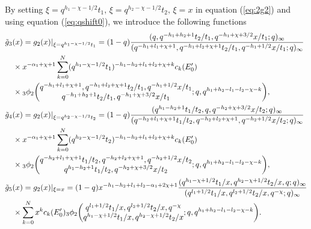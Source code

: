 \documentclass[12pt]{amsart}
\numberwithin{equation}{section}
\theoremstyle{definition}
\theoremstyle{remark}
\begin{document}
By setting $\xi = q^{h_{1} - \chi - 1/2}t_{1}, \, \xi = q^{h_{2} - \chi - 1/2}t_{2}, \, \xi = x$ in equation (\ref{eq:2g2}) and using equation (\ref{eq:qshift0}), we introduce the following functions
  \begin{align*}
& \tilde{g}_{3}(x) = g_2 (x) | _{\xi = q^{h_{1} - \chi - 1/2}t_{1} } = (1 - q) \frac{(q, q^{- h_{1} + h_{2} + 1}t_{2}/t_{1}, q^{- h_{1} + \chi + 3/2}x/t_{1}; q)_\infty}{(q^{-h_{1} + l_{1} + \chi + 1}, q^{-h_{1} + l_{2} + \chi + 1}t_{2}/t_{1}, q^{-h_{1} + 1/2}x/t_{1}; q)_\infty} \notag \\
  &\quad \times x^{-\alpha_{1} + \chi + 1} \sum_{k = 0}^{N} (q^{h_{1} - \chi - 1/2}t_{1})^{-h_{1} - h_{2} + l_{1} + l_{2} + \chi + k} c_{k} (E_{0}') \notag \\
  &\quad \times {}_3\phi_2 \biggl( \begin{array}{@{}c@{}} q^{-h_{1} + l_{1} + \chi + 1}, q^{-h_{1} + l_{2} + \chi + 1}t_{2}/t_{1}, q^{-h_{1} + 1/2}x/t_{1} \\
     q^{- h_{1} + h_{2} + 1}t_{2}/t_{1}, q^{- h_{1} + \chi + 3/2}x/t_{1} \end{array} ;q,q^{h_{1} + h_{2} - l_{1} - l_{2} - \chi - k} \biggr), \\
& \tilde{g}_{4}(x) = g_2 (x) | _{\xi = q^{h_{2} - \chi - 1/2}t_{2} } =  (1 - q)  \frac{(q^{h_{1} - h_{2} + 1}t_{1}/t_{2}, q, q^{- h_{2} + \chi + 3/2}x/t_{2}; q)_\infty}{(q^{-h_{2} + l_{1} + \chi + 1}t_{1}/t_{2}, q^{-h_{2} + l_{2} + \chi + 1}, q^{-h_{2} + 1/2}x/t_{2}; q)_\infty} \notag \\
  &\quad \times x^{-\alpha_{1} + \chi + 1} \sum_{k = 0}^{N} (q^{h_{2} - \chi - 1/2}t_{2})^{-h_{1} - h_{2} + l_{1} + l_{2} + \chi + k} c_{k} (E_{0}') \notag \\
  &\quad \times {}_3\phi_2 \biggl( \begin{array}{@{}c@{}} q^{-h_{2} + l_{1} + \chi + 1}t_{1}/t_{2}, q^{-h_{2} + l_{2} + \chi + 1}, q^{-h_{2} + 1/2}x/t_{2} \\
     q^{h_{1} - h_{2} + 1}t_{1}/t_{2}, q^{- h_{2} + \chi + 3/2}x/t_{2} \end{array} ;q,q^{h_{1} + h_{2} - l_{1} - l_{2} - \chi - k} \biggr), \\
& \tilde{g}_{5}(x) = g_2 (x) | _{\xi =  x } =  (1 - q) x^{-h_{1} - h_{2} + l_{1} + l_{2} -\alpha_{1} + 2\chi + 1} \frac{(q^{h_{1} - \chi + 1/2}t_{1}/x, q^{h_{2} - \chi + 1/2}t_{2}/x, q; q)_{\infty}}{(q^{l_{1} + 1/2}t_{1}/x, q^{l_{2} + 1/2}t_{2}/x, q^{-\chi}; q)_{\infty}} \notag \\
  &\quad \times \sum_{k = 0}^{N} x^k c_{k}  (E_{0}') {}_3\phi_2 \biggl( \begin{array}{@{}c@{}} q^{l_{1} + 1/2}t_{1}/x, q^{l_{2} + 1/2}t_{2}/x, q^{-\chi} \\
     q^{h_{1} - \chi + 1/2}t_{1}/x, q^{h_{2} - \chi + 1/2}t_{2}/x \end{array} ;q,q^{h_{1} + h_{2} - l_{1} - l_{2} - \chi - k} \biggr).
  \end{align*}
\end{document}
